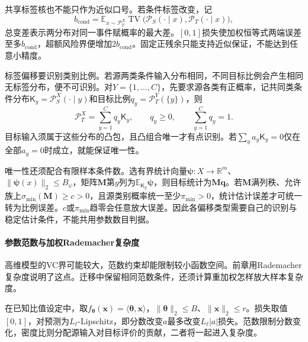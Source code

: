 共享标签核也不能只作为近似口号。若条件标签改变，记
\[
 b_{\mathrm{cond}}=\mathbb E_{x\sim\mathcal P_T^X}
 \operatorname{TV}\bigl(\mathcal P_S(\cdot\mid x),
                        \mathcal P_T(\cdot\mid x)\bigr),
\]
总变差表示两分布对同一事件赋概率的最大差。$[0,1]$损失使加权恒等式两端误差至多$b_{\mathrm{cond}}$，超额风险界便增加$2b_{\mathrm{cond}}$。固定正残余只能支持近似保证，不能达到任意小精度。

标签偏移要识别类别比例。若源两类条件输入分布相同，不同目标比例会产生相同无标签分布，便不可识别。对$Y=\{1,\ldots,C\}$，先要求源各类有正概率，记共同类条件分布$\mathsf K_y=\mathcal P_S^X(\cdot\mid y)$和目标比例$q_y=\mathcal P_T^Y(\{y\})$，则
\[
 \mathcal P_T^X=\sum_{y=1}^{C}q_y\mathsf K_y,\qquad
 q_y\geq0,\qquad \sum_{y=1}^{C}q_y=1.
\]
目标输入须属于这些分布的凸包，且凸组合唯一才有点识别。若$\sum_y a_y\mathsf K_y=0$仅在全部$a_y=0$时成立，就能保证唯一性。

唯一性还须配合有限样本条件数。选有界统计向量$\bm\psi:X\to\mathbb R^m$、$\|\bm\psi(x)\|_2\leq B_\psi$，矩阵$\bm M$第$y$列为$\mathbb E_{\mathsf K_y}\bm\psi$，则目标统计为$\bm M\bm q$。若$\bm M$满列秩、允许族上$\sigma_{\min}(\bm M)\geq c>0$，且源类别概率统一至少$\pi_{\min}>0$，统计估计误差才可统一转为比例误差。$c$或$\pi_{\min}$趋零会任意放大误差。因此各偏移类型需要自己的识别与稳定估计条件，不能共用参数数目判据。

\paragraph{参数范数与加权Rademacher复杂度}
\label{sec:transfer-norm-complexity}

高维模型的VC界可能较大，范数约束却能限制较小函数空间。前章用Rademacher复杂度说明了这点。迁移中保留相同范数条件，还须计算重加权怎样放大样本复杂度。

在已知比值设定中，取$f_{\bm\theta}(\bm x)=\langle\bm\theta,\bm x\rangle$，$\|\bm\theta\|_2\leq B$、$\|\bm x\|_2\leq r$。损失取值$[0,1]$，对预测为$L_{\ell}$-Lipschitz，即分数改变$a$最多改变$L_{\ell}|a|$损失。范数限制分数变化，密度比则分配源输入对目标评价的贡献，二者将一起进入复杂度。

